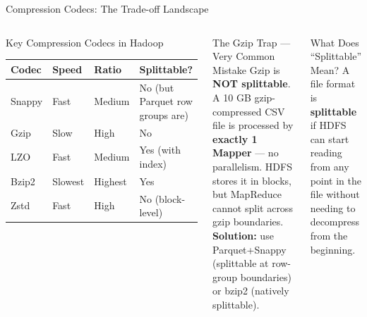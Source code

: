 \documentclass[aspectratio=169,10pt]{beamer}
\begin{document}
\begin{frame}{Compression Codecs: The Trade-off Landscape}
  \begin{columns}[T]
      \begin{block}{Key Compression Codecs in Hadoop}
        \renewcommand{\arraystretch}{1.3}
        \begin{tabular}{p{1.4cm}p{1.1cm}p{1.0cm}p{1.6cm}}
          \toprule
          \textbf{Codec} & \textbf{Speed} & \textbf{Ratio} & \textbf{Splittable?} \\
          \midrule
          Snappy & Fast & Medium & No (but Parquet row groups are) \\
          Gzip   & Slow & High   & \alert{No} \\
          LZO    & Fast & Medium & Yes (with index) \\
          Bzip2  & Slowest & Highest & Yes \\
          Zstd   & Fast & High   & No (block-level) \\
          \bottomrule
        \end{tabular}
      \end{block}
      \vspace{6pt}
      \begin{alertblock}{The Gzip Trap — Very Common Mistake}
        Gzip is \textbf{NOT splittable}.  A 10 GB gzip-compressed CSV file is processed by \textbf{exactly 1 Mapper} — no parallelism.  HDFS stores it in blocks, but MapReduce cannot split across gzip boundaries.  \textbf{Solution:} use Parquet+Snappy (splittable at row-group boundaries) or bzip2 (natively splittable).
      \end{alertblock}

      \begin{exampleblock}{What Does ``Splittable'' Mean?}
        A file format is \textbf{splittable} if HDFS can start reading from any point in the file without needing to decompress from the beginning.
        \vspace{6pt}
\end{exampleblock}
\end{columns}
\end{frame}
\end{document}
